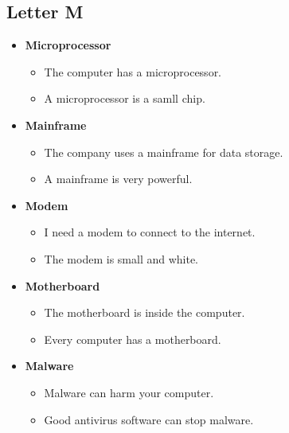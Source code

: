     \subsection{Letter M}
    \begin{itemize}
        \item \textbf{Microprocessor}
        \begin{itemize}
            \item The computer has a microprocessor.
            \item A microprocessor is a samll chip.
        \end{itemize}
        \item \textbf{Mainframe}
        \begin{itemize}
            \item The company uses a mainframe for data storage.
            \item A mainframe is very powerful.
        \end{itemize}
        \item \textbf{Modem}
        \begin{itemize}
            \item I need a modem to connect to the internet.
            \item The modem is small and white.
        \end{itemize}
        \item \textbf{Motherboard}
        \begin{itemize}
            \item The motherboard is inside the computer.
            \item Every computer has a motherboard.
        \end{itemize}
        \item \textbf{Malware}
        \begin{itemize}
            \item Malware can harm your computer.
            \item Good antivirus software can stop malware.
        \end{itemize}
    \end{itemize}
